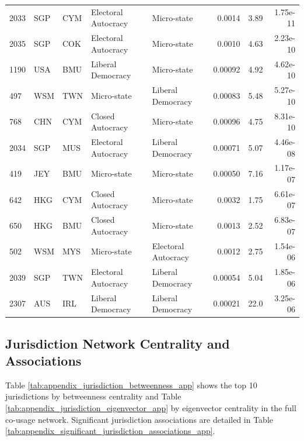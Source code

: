 {\begin{longtable}{@{}lllp{2.2cm}p{2.2cm}rrr@{}}
2033& SGP & CYM & Electoral Autocracy & Micro-state         & 0.0014   & 3.89      & 1.75e-11  \\
2035& SGP & COK & Electoral Autocracy & Micro-state         & 0.0010   & 4.63      & 2.23e-10  \\
1190& USA & BMU & Liberal Democracy   & Micro-state         & 0.00092  & 4.92      & 4.62e-10  \\
497 & WSM & TWN & Micro-state         & Liberal Democracy   & 0.00083  & 5.48      & 5.27e-10  \\
768 & CHN & CYM & Closed Autocracy    & Micro-state         & 0.00096  & 4.75      & 8.31e-10  \\
2034& SGP & MUS & Electoral Autocracy & Liberal Democracy   & 0.00071  & 5.07      & 4.46e-08  \\
419 & JEY & BMU & Micro-state         & Micro-state         & 0.00050  & 7.16      & 1.17e-07  \\
642 & HKG & CYM & Closed Autocracy    & Micro-state         & 0.0032   & 1.75      & 6.61e-07  \\
650 & HKG & BMU & Closed Autocracy    & Micro-state         & 0.0013   & 2.52      & 6.83e-07  \\
502 & WSM & MYS & Micro-state         & Electoral Autocracy & 0.0012   & 2.75      & 1.54e-06  \\
2039& SGP & TWN & Electoral Autocracy & Liberal Democracy   & 0.00054  & 5.04      & 1.85e-06  \\
2307& AUS & IRL & Liberal Democracy   & Liberal Democracy   & 0.00021  & 22.0      & 3.25e-06  \\
\end{longtable}
} 
\clearpage
\newpage


\subsection{Jurisdiction Network Centrality and Associations}
\label{sec:appendix_jurisdiction_network}

Table \ref{tab:appendix_jurisdiction_betweenness_app} shows the top 10 jurisdictions by betweenness centrality and Table \ref{tab:appendix_jurisdiction_eigenvector_app} by eigenvector centrality in the full co-usage network. Significant jurisdiction associations are detailed in Table \ref{tab:appendix_significant_jurisdiction_associations_app}.

